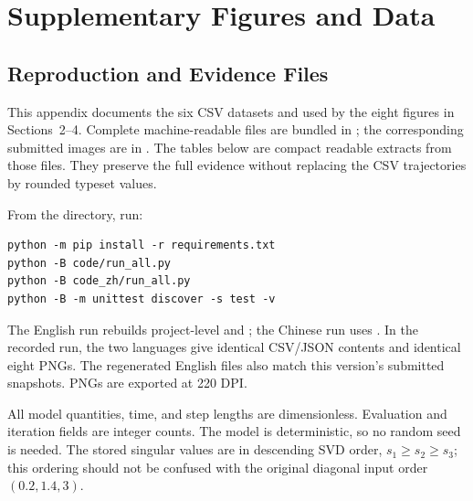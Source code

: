 
\section{Supplementary Figures and Data}
\label{sec:appendix_c}

\subsection{Reproduction and Evidence Files}
This appendix documents the six CSV datasets and 
used by the eight figures in Sections~2--4. Complete machine-readable
files are bundled in ; the corresponding submitted
images are in . The tables below are compact
readable extracts from those files. They preserve the full evidence
without replacing the CSV trajectories by rounded typeset values.

From the  directory, run:
\begin{lstlisting}
python -m pip install -r requirements.txt
python -B code/run_all.py
python -B code_zh/run_all.py
python -B -m unittest discover -s test -v
\end{lstlisting}
The English run rebuilds project-level  and ;
the Chinese run uses . In the recorded run, the two
languages give identical CSV/JSON contents and identical eight PNGs.
The regenerated English files also match this version's submitted
snapshots. PNGs are exported at 220 DPI.

All model quantities, time, and step lengths are dimensionless.
Evaluation and iteration fields are integer counts.
The model is deterministic, so no random seed is needed.
The stored singular values are in descending SVD order,
$s_1\geq s_2\geq s_3$; this ordering should not be confused with
the original diagonal input order $(0.2,1.4,3)$.

